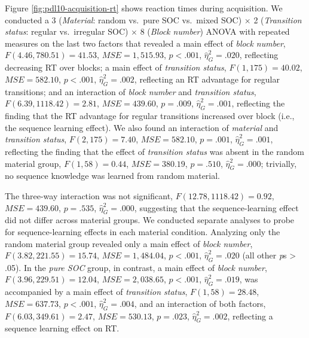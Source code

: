 \documentclass[floatsintext,doc]{apa6}
\theoremstyle{definition}
\theoremstyle{definition}
\theoremstyle{definition}
\theoremstyle{remark}
\begin{document}
Figure \ref{fig:pdl10-acquisition-rt} shows reaction times during
acquisition. We conducted a 3 (\emph{Material}: random vs.~pure SOC
vs.~mixed SOC) \(\times\) 2 (\emph{Transition status}: regular
vs.~irregular SOC) \(\times\) 8 (\emph{Block number}) ANOVA with
repeated measures on the last two factors that revealed a main effect of
\emph{block number}, \(F(4.46, 780.51) = 41.53\),
\(\mathit{MSE} = 1,515.93\), \(p < .001\), \(\hat{\eta}^2_G = .020\),
reflecting decreasing RT over blocks; a main effect of \emph{transition
status}, \(F(1, 175) = 40.02\), \(\mathit{MSE} = 582.10\), \(p < .001\),
\(\hat{\eta}^2_G = .002\), reflecting an RT advantage for regular
transitions; and an interaction of \emph{block number} and
\emph{transition status}, \(F(6.39, 1118.42) = 2.81\),
\(\mathit{MSE} = 439.60\), \(p = .009\), \(\hat{\eta}^2_G = .001\),
reflecting the finding that the RT advantage for regular transitions
increased over block (i.e., the sequence learning effect). We also found
an interaction of \emph{material} and \emph{transition status},
\(F(2, 175) = 7.40\), \(\mathit{MSE} = 582.10\), \(p = .001\),
\(\hat{\eta}^2_G = .001\), reflecting the finding that the effect of
\emph{transition status} was absent in the random material group,
\(F(1, 58) = 0.44\), \(\mathit{MSE} = 380.19\), \(p = .510\),
\(\hat{\eta}^2_G = .000\); trivially, no sequence knowledge was learned
from random material.

The three-way interaction was not significant,
\(F(12.78, 1118.42) = 0.92\), \(\mathit{MSE} = 439.60\), \(p = .535\),
\(\hat{\eta}^2_G = .000\), suggesting that the sequence-learning effect
did not differ across material groups. We conducted separate analyses to
probe for sequence-learning effects in each material condition.
Analyzing only the random material group revealed only a main effect of
\emph{block number}, \(F(3.82, 221.55) = 15.74\),
\(\mathit{MSE} = 1,484.04\), \(p < .001\), \(\hat{\eta}^2_G = .020\)
(all other \emph{p}s \textgreater{} .05). In the \emph{pure SOC} group,
in contrast, a main effect of \emph{block number},
\(F(3.96, 229.51) = 12.04\), \(\mathit{MSE} = 2,038.65\), \(p < .001\),
\(\hat{\eta}^2_G = .019\), was accompanied by a main effect of
\emph{transition status}, \(F(1, 58) = 28.48\),
\(\mathit{MSE} = 637.73\), \(p < .001\), \(\hat{\eta}^2_G = .004\), and
an interaction of both factors, \(F(6.03, 349.61) = 2.47\),
\(\mathit{MSE} = 530.13\), \(p = .023\), \(\hat{\eta}^2_G = .002\),
reflecting a sequence learning effect on RT.
\end{document}
